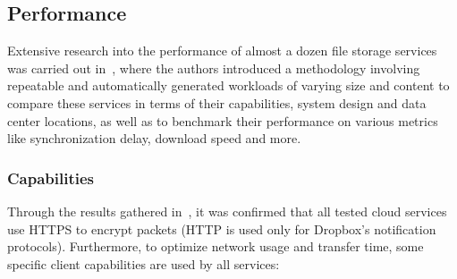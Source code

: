 \subsection{Performance}
Extensive research into the performance of almost a dozen file storage services was carried out in~\cite{personal1}, where the authors introduced a methodology involving repeatable and automatically generated workloads of varying size and content to compare these services in terms of their capabilities, system design and data center locations, as well as to benchmark their performance on various metrics like synchronization delay, download speed and more.

\subsubsection{Capabilities}
Through the results gathered in~\cite{personal1}, it was confirmed that all tested cloud services use HTTPS to encrypt packets (HTTP is used only for Dropbox's notification protocols). Furthermore, to optimize network usage and transfer time, some specific client capabilities are used by all services:

